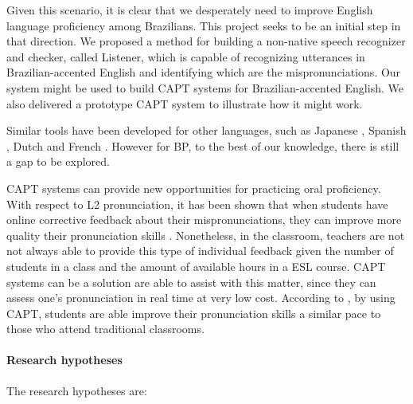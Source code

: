 Given this scenario, it is clear that we desperately need to improve English language proficiency among Brazilians. This project seeks to be an initial step in that direction. We proposed a method for building a non-native speech recognizer and checker, called Listener, which is capable of recognizing utterances in Brazilian-accented English and identifying which are the mispronunciations. Our system might be used to build \ac{CAPT} systems for Brazilian-accented English. We also delivered a prototype \ac{CAPT} system to illustrate how it might work.

Similar tools have been developed for other languages, such as Japanese \cite{Tsubota2004}, Spanish \cite{Reis2011}, Dutch \cite{Strik2009} and French \cite{GenevaLogic2006}. However for \ac{BP}, to the best of our knowledge, there is still a gap to be explored.

\ac{CAPT} systems can provide new opportunities for practicing oral proficiency. With respect to L2 pronunciation, it has been shown that when students have online corrective feedback about their mispronunciations, they can improve more quality their pronunciation skills \cite{Long1983, Lyster2010}. Nonetheless, in the classroom, teachers are not not always able to provide this type of individual feedback given the number of students in a class and the amount of available hours in a \ac{ESL} course. \ac{CAPT} systems can be a solution are able to assist with this matter, since they  can assess one's pronunciation in real time at very low cost. According to \citeauthor{Neri2008} \cite{Neri2008}, by using \ac{CAPT}, students are able improve their pronunciation skills a similar pace to those who attend traditional classrooms.

\paragraph{Research hypotheses}

The research hypotheses are:

